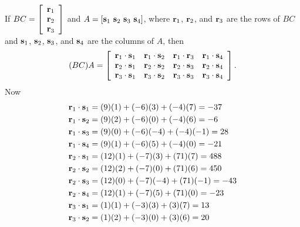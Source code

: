 \begin{example}
If $BC = \left[ \begin{array}{c} \mathbf{r}_1 \\  \mathbf{r}_2 \\ \mathbf{r}_3 \end{array} \right]$ and $A = [\mathbf{s}_1 \ \mathbf{s}_2 \ \mathbf{s}_3 \ \mathbf{s}_4]$, where $\mathbf{r}_1$, $\mathbf{r}_2$, and $\mathbf{r}_3$ are the rows of $BC$ and $\mathbf{s}_1$, $\mathbf{s}_2$, $\mathbf{s}_3$, and $\mathbf{s}_4$ are the columns of $A$, then 
\[(BC)A = \left[ \begin{array}{cccc} \mathbf{r}_1 \cdot \mathbf{s}_1 & \mathbf{r}_1 \cdot \mathbf{s}_2 & \mathbf{r}_1 \cdot \mathbf{r}_3 & \mathbf{r}_1 \cdot \mathbf{s}_4 \\ \mathbf{r}_2 \cdot \mathbf{s}_1 & \mathbf{r}_2 \cdot \mathbf{s}_2 & \mathbf{r}_2 \cdot \mathbf{s}_3 & \mathbf{r}_2 \cdot \mathbf{s}_4 \\ \mathbf{r}_3 \cdot \mathbf{s}_1 & \mathbf{r}_3 \cdot \mathbf{s}_2 & \mathbf{r}_3 \cdot \mathbf{s}_3 & \mathbf{r}_3 \cdot \mathbf{s}_4  \end{array} \right].\]
Now
\begin{align*}
\vr_1 \cdot \vs_1 &= (9)(1)+(-6)(3)+(-4)(7) = -37 \\
\vr_1 \cdot \vs_2 &= (9)(2)+(-6)(0)+(-4)(6) = -6 \\
\vr_1 \cdot \vs_3 &= (9)(0)+(-6)(-4)+(-4)(-1) = 28 \\
\vr_1 \cdot \vs_4 &= (9)(1)+(-6)(5)+(-4)(0) = -21 \\ 
\vr_2 \cdot \vs_1 &= (12)(1)+(-7)(3)+(71)(7) = 488 \\
\vr_2 \cdot \vs_2 &= (12)(2)+(-7)(0)+(71)(6) = 450 \\
\vr_2 \cdot \vs_3 &= (12)(0)+(-7)(-4)+(71)(-1) = -43 \\
\vr_2 \cdot \vs_4 &= (12)(1)+(-7)(5)+(71)(0) = -23 \\
\vr_3 \cdot \vs_1 &= (1)(1)+(-3)(3)+(3)(7) = 13 \\
\vr_3 \cdot \vs_2 &= (1)(2)+(-3)(0)+(3)(6) = 20 \\

\end{align*}
\end{example}
